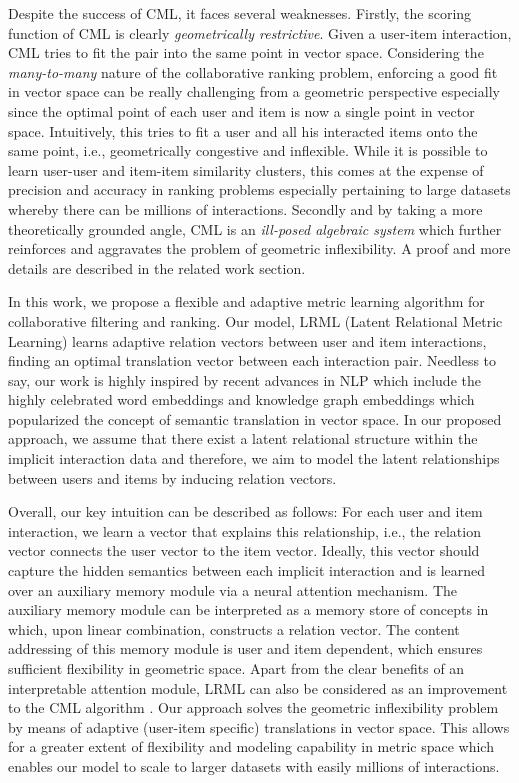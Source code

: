 \documentclass[sigconf]{acmart}
\begin{document}
Despite the success of CML, it faces several weaknesses. Firstly, the scoring function of CML is clearly \textit{geometrically restrictive}. Given a user-item interaction, CML tries to fit the pair into the same point in vector space. Considering the \textit{many-to-many} nature of the collaborative ranking problem, enforcing a good fit in vector space can be really challenging from a geometric perspective especially since the optimal point of each user and item is now a single point in vector space. Intuitively, this tries to fit a user and all his interacted items onto the same point, i.e., geometrically congestive and inflexible. While it is possible to learn user-user and item-item similarity clusters, this comes at the expense of precision and accuracy in ranking problems especially pertaining to large datasets whereby there can be millions of interactions. Secondly and by taking a more theoretically grounded angle, CML is an \textit{ill-posed algebraic system} \cite{illposed} which further reinforces and aggravates the problem of geometric inflexibility. A proof and more details are described in the related work section. 

In this work, we propose a flexible and adaptive metric learning algorithm for collaborative filtering and ranking. Our model, LRML (Latent Relational Metric Learning) learns adaptive relation vectors between user and item interactions, finding an optimal translation vector between each interaction pair. Needless to say, our work is highly inspired by recent advances in NLP which include the highly celebrated word embeddings \cite{DBLP:conf/nips/MikolovSCCD13} and knowledge graph embeddings \cite{DBLP:conf/nips/BordesUGWY13,DBLP:conf/aaai/LinLSLZ15,DBLP:conf/aaai/TayLH17} which popularized the concept of semantic translation in vector space. In our proposed approach, we assume that there exist a latent relational structure within the implicit interaction data and therefore, we aim to model the latent relationships between users and items by inducing relation vectors. 

Overall, our key intuition can be described as follows: For each user and item interaction, we learn a vector  that explains this relationship, i.e., the relation vector  connects the user vector to the item vector. Ideally, this vector  should capture the hidden semantics between each implicit interaction and is learned over an auxiliary memory module via a neural attention mechanism. The auxiliary memory module can be interpreted as a memory store of concepts in which, upon linear combination, constructs a relation vector. The content addressing of this memory module is user and item dependent, which ensures sufficient flexibility in geometric space. Apart from the clear benefits of an interpretable attention module, LRML can also be considered as an improvement to the CML algorithm \cite{DBLP:conf/www/HsiehYCLBE17}. Our approach solves the geometric inflexibility problem by means of adaptive (user-item specific) translations in vector space. This allows for a greater extent of flexibility and modeling capability in metric space which enables our model to scale to larger datasets with easily millions of interactions. 
\end{document}
